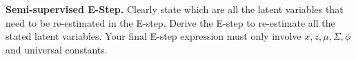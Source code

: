 \item{}
\textbf{Semi-supervised E-Step.}
Clearly state which are all the latent variables that need to be re-estimated in the E-step. Derive the E-step to re-estimate all the stated latent variables. Your final E-step expression must only involve $x, z, \mu, \Sigma, \phi$ and universal constants.

\ifnum{} {
  
} \fi
